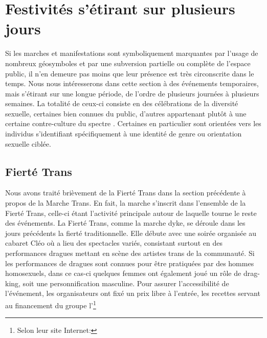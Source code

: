 \section{Festivités s'étirant sur plusieurs jours}
\label{sec:festivitesplusieursjours}
Si les marches et manifestations sont symboliquement marquantes par l'usage de nombreux géosymboles et par une subversion partielle ou complète de l'espace public, il n’en demeure pas moins que leur présence est très circonscrite dans le temps.
Nous nous intéresserons dans cette section à des événements temporaires, mais s'étirant sur une longue période, de l'ordre de plusieurs journées à plusieurs semaines.
La totalité de ceux-ci consiste en des célébrations de la diversité sexuelle, certaines bien connues du public, d'autres appartenant plutôt à une certaine contre-culture du spectre \lgbt. 
Certaines en particulier sont orientées vers les individus s'identifiant spécifiquement à une identité de genre ou orientation sexuelle ciblée.

\subsection{Fierté Trans}
\label{subsec:fiertetrans}
Nous avons traité brièvement de la Fierté Trans dans la section précédente à propos de la Marche Trans.
En fait, la marche s'inscrit dans l'ensemble de la Fierté Trans, celle-ci étant l'activité principale autour de laquelle tourne le reste des événements.
La Fierté Trans, comme la marche dyke, se déroule dans les jours précédents la fierté traditionnelle.
Elle débute avec une soirée organisée au cabaret Cléo où a lieu des spectacles variés, consistant surtout en des performances dragues mettant en scène des artistes trans de la communauté.
Si les performances de dragues sont connues pour être pratiquées par des hommes homosexuels, dans ce cas-ci quelques femmes ont également joué un rôle de drag-king, soit une personnification masculine.
Pour assurer l'accessibilité de l'événement, les organisateurs ont fixé un prix libre à l'entrée, les recettes servant au financement du groupe l'\astteq{}\footnote{Selon leur site Internet: }

